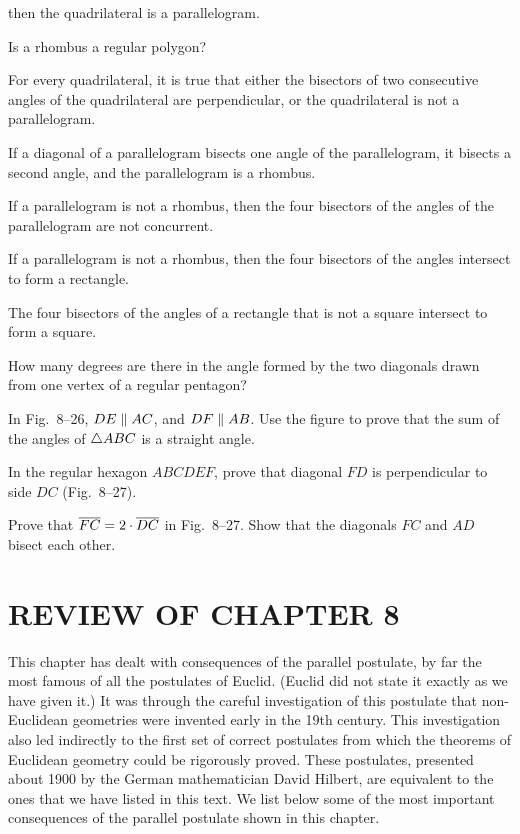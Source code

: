 \documentclass[11pt]{book}
\begin{document}
\begin{exercisecols}
\begin{exlist}
  then the quadrilateral is a parallelogram.
\item Is a rhombus a regular polygon?
\item For every quadrilateral, it is true that either the bisectors of two
  consecutive angles of the quadrilateral are perpendicular, or the
  quadrilateral is not a parallelogram.
\item If a diagonal of a parallelogram bisects one angle of the parallelogram,
  it bisects a second angle, and the parallelogram is a rhombus.
\item If a parallelogram is not a rhombus, then the four bisectors of the
  angles of the parallelogram are not concurrent.
\item If a parallelogram is not a rhombus, then the four bisectors of the
  angles intersect to form a rectangle.
\item The four bisectors of the angles of a rectangle that is not a square
  intersect to form a square.
\item How many degrees are there in the angle formed by the two diagonals
  drawn from one vertex of a regular pentagon?
\item In Fig.~8--26, $DE \mathrel{\|} AC$, and $DF \mathrel{\|} AB$. Use the figure to prove
  that the sum of the angles of $\triangle ABC$ is a straight angle.
\exfig{\FIGVIIITWENTYSIX}
\item In the regular hexagon $ABCDEF$, prove that diagonal $FD$ is
  perpendicular to side $DC$ (Fig.~8--27).
\exfig{\FIGVIIITWENTYSEVEN}
\item Prove that $\overline{FC} = 2 \cdot \overline{DC}$ in Fig.~8--27. Show that the
  diagonals $FC$ and $AD$ bisect each other.
\end{exlist}
\end{exercisecols}

\section*{REVIEW OF CHAPTER 8}

This chapter has dealt with consequences of the parallel postulate, by far the
most famous of all the postulates of Euclid. (Euclid did not state it exactly
as we have given it.) It was through the careful investigation of this
postulate that non-Euclidean geometries were invented early in the 19th
century. This investigation also led indirectly to the first set of correct
postulates from which the theorems of Euclidean geometry could be rigorously
proved. These postulates, presented about 1900 by the German mathematician
David Hilbert, are equivalent to the ones that we have listed in this text. We
list below some of the most important consequences of the parallel postulate
shown in this chapter.
\end{document}
